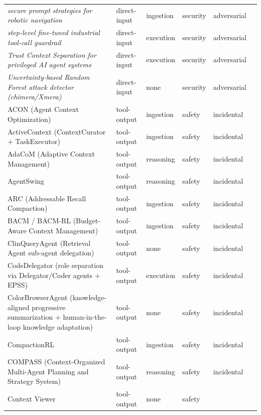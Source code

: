 \begin{longtable}{@{}>{\raggedright\arraybackslash}p{}lllll@{}}
\emph{secure prompt strategies for robotic navigation} & direct-input & ingestion & security & adversarial & \cite{zhang-2024-study} \\
\emph{step-level fine-tuned industrial tool-call guardrail} & direct-input & execution & security & adversarial & \cite{xue-2026-multiagent} \\
\emph{Trust Context Separation for privileged AI agent systems} & direct-input & execution & security & adversarial & \cite{singh-2026-securingb} \\
\emph{Uncertainty-based Random Forest attack detector (chimera/Xmera)} & direct-input & none & security & adversarial & \cite{fastowski-2025-injecting} \\
ACON (Agent Context Optimization) & tool-output & ingestion & safety & incidental & \cite{kang-2025-acon} \\
ActiveContext (ContextCurator + TaskExecutor) & tool-output & ingestion & safety & incidental & \cite{li-2026-escaping} \\
AdaCoM (Adaptive Context Management) & tool-output & reasoning & safety & incidental & \cite{yi-2026-learning} \\
AgentSwing & tool-output & reasoning & safety & incidental & \cite{feng-2026-agentswing} \\
ARC (Addressable Recall Compaction) & tool-output & ingestion & safety & incidental & \cite{dang-2026-addressable} \\
BACM / BACM-RL (Budget-Aware Context Management) & tool-output & ingestion & safety & incidental & \cite{wu-2026-contextbudget} \\
ClinQueryAgent (Retrieval Agent sub-agent delegation) & tool-output & none & safety & incidental & \cite{boyle-2026-clinqueryagent} \\
CodeDelegator (role separation via Delegator/Coder agents + EPSS) & tool-output & execution & safety & incidental & \cite{fei-2026-codedelegator} \\
ColorBrowserAgent (knowledge-aligned progressive summarization + human-in-the-loop knowledge adaptation) & tool-output & none & safety & incidental & \cite{wang-2026-colorbrowseragent} \\
CompactionRL & tool-output & ingestion & safety & incidental & \cite{li-2026-compactionrl} \\
COMPASS (Context-Organized Multi-Agent Planning and Strategy System) & tool-output & reasoning & safety & incidental & \cite{wan-2025-compass} \\
Context Viewer & tool-output & none & safety &  & \cite{sriraman-2026-context} \\

\end{longtable}
